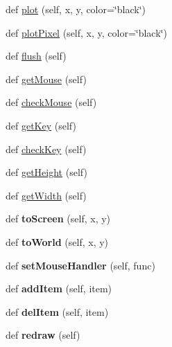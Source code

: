 \begin{DoxyCompactItemize}
\item 
def \hyperlink{classgraphics_1_1GraphWin_ac93adafee6ea1c0d9bb32b64cfbe754c}{plot} (self, x, y, color=\char`\"{}black\char`\"{})
\item 
def \hyperlink{classgraphics_1_1GraphWin_a66ef7f9b272d4ef482f834855ccfa0c4}{plot\+Pixel} (self, x, y, color=\char`\"{}black\char`\"{})
\item 
def \hyperlink{classgraphics_1_1GraphWin_a232137e7f2464c4ed6fa4a6fd5022196}{flush} (self)
\item 
def \hyperlink{classgraphics_1_1GraphWin_a4fdf1cf728e9aa559f2912592f66c23e}{get\+Mouse} (self)
\item 
def \hyperlink{classgraphics_1_1GraphWin_a47a21f43176302d35e418810c88235ea}{check\+Mouse} (self)
\item 
def \hyperlink{classgraphics_1_1GraphWin_adf821f120ef3baf805a4945b009b4903}{get\+Key} (self)
\item 
def \hyperlink{classgraphics_1_1GraphWin_a84c703d3a1521fc5edb4fd8af462ebd1}{check\+Key} (self)
\item 
def \hyperlink{classgraphics_1_1GraphWin_a100d08973109234fa8b17ccc0ac3ff89}{get\+Height} (self)
\item 
def \hyperlink{classgraphics_1_1GraphWin_a5bad6bf8b35250baf4f4b45993f85162}{get\+Width} (self)
\item 
def {\bfseries to\+Screen} (self, x, y)\hypertarget{classgraphics_1_1GraphWin_a4dfd70dc27ff32544c0eee0e73f52c36}{}\label{classgraphics_1_1GraphWin_a4dfd70dc27ff32544c0eee0e73f52c36}

\item 
def {\bfseries to\+World} (self, x, y)\hypertarget{classgraphics_1_1GraphWin_a6c40e111bf739598f2128c95977caff7}{}\label{classgraphics_1_1GraphWin_a6c40e111bf739598f2128c95977caff7}

\item 
def {\bfseries set\+Mouse\+Handler} (self, func)\hypertarget{classgraphics_1_1GraphWin_a6b0162764403abcbb64d3de5a8e21c1c}{}\label{classgraphics_1_1GraphWin_a6b0162764403abcbb64d3de5a8e21c1c}

\item 
def {\bfseries add\+Item} (self, item)\hypertarget{classgraphics_1_1GraphWin_acb38179ff82c99fe11e5150e2fbbf1e4}{}\label{classgraphics_1_1GraphWin_acb38179ff82c99fe11e5150e2fbbf1e4}

\item 
def {\bfseries del\+Item} (self, item)\hypertarget{classgraphics_1_1GraphWin_a617ee0e44a58c66c06df5d4d51edbee5}{}\label{classgraphics_1_1GraphWin_a617ee0e44a58c66c06df5d4d51edbee5}

\item 
def {\bfseries redraw} (self)\hypertarget{classgraphics_1_1GraphWin_afd181d963aa18c8f8215c114d6124b72}{}\label{classgraphics_1_1GraphWin_afd181d963aa18c8f8215c114d6124b72}

\end{DoxyCompactItemize}
